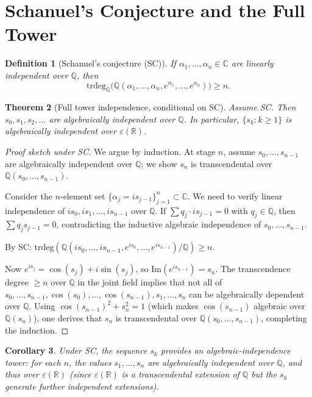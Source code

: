 \documentclass[11pt]{article}
\newtheorem{theorem}{Theorem}
\newtheorem{corollary}[theorem]{Corollary}
\newtheorem{definition}[theorem]{Definition}
\begin{document}
\section{Schanuel's Conjecture and the Full Tower}

\begin{definition}[Schanuel's conjecture (SC)]
If $\alpha_1,\ldots,\alpha_n\in\mathbb{C}$ are linearly independent over $\mathbb{Q}$, then
\[
\mathrm{trdeg}_\mathbb{Q}\bigl(\mathbb{Q}(\alpha_1,\ldots,\alpha_n,e^{\alpha_1},\ldots,e^{\alpha_n})\bigr)\geq n.
\]
\end{definition}

\begin{theorem}[Full tower independence, conditional on SC]
\label{thm:tower}
Assume SC. Then $s_0,s_1,s_2,\ldots$ are algebraically independent over $\mathbb{Q}$.
In particular, $\{s_k:k\geq1\}$ is algebraically independent over $\varepsilon(\mathbb{R})$.
\end{theorem}

\begin{proof}[Proof sketch under SC]
We argue by induction. At stage $n$, assume $s_0,\ldots,s_{n-1}$ are algebraically independent
over $\mathbb{Q}$; we show $s_n$ is transcendental over $\mathbb{Q}(s_0,\ldots,s_{n-1})$.

Consider the $n$-element set $\{\alpha_j = is_{j-1}\}_{j=1}^n \subset \mathbb{C}$.
We need to verify linear independence of $is_0, is_1,\ldots, is_{n-1}$ over $\mathbb{Q}$.
If $\sum q_j\cdot is_{j-1}=0$ with $q_j\in\mathbb{Q}$, then $\sum q_j s_{j-1}=0$,
contradicting the inductive algebraic independence of $s_0,\ldots,s_{n-1}$.

By SC: $\mathrm{trdeg}(\mathbb{Q}(is_0,\ldots,is_{n-1},e^{is_0},\ldots,e^{is_{n-1}})/\mathbb{Q})\geq n$.

Now $e^{is_j}=\cos(s_j)+i\sin(s_j)$, so $\mathrm{Im}(e^{is_{n-1}})=s_n$.
The transcendence degree $\geq n$ over $\mathbb{Q}$ in the joint field implies that
not all of $s_0,\ldots,s_{n-1},\cos(s_0),\ldots,\cos(s_{n-1}),s_1,\ldots,s_n$
can be algebraically dependent over $\mathbb{Q}$.
Using $\cos(s_{n-1})^2+s_n^2=1$ (which makes $\cos(s_{n-1})$ algebraic over $\mathbb{Q}(s_n)$),
one derives that $s_n$ is transcendental over $\mathbb{Q}(s_0,\ldots,s_{n-1})$,
completing the induction.
\end{proof}

\begin{corollary}
Under SC, the sequence $s_k$ provides an \emph{algebraic-independence tower}:
for each $n$, the values $s_1,\ldots,s_n$ are algebraically independent over $\mathbb{Q}$,
and thus over $\varepsilon(\mathbb{R})$ (since $\varepsilon(\mathbb{R})$ is a transcendental
extension of $\mathbb{Q}$ but the $s_k$ generate further independent extensions).
\end{corollary}
\end{document}
